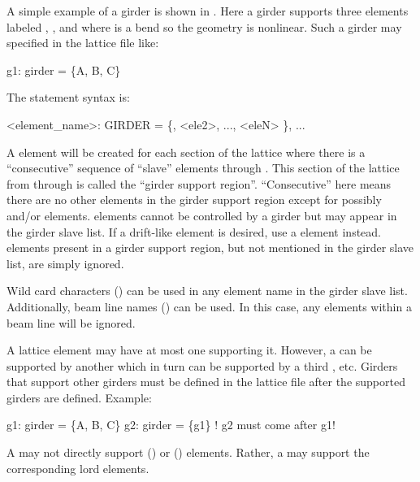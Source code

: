 A simple example of a girder is shown in . Here a girder
supports three elements labeled , , and  where
 is a bend so the geometry is nonlinear. Such a girder may
specified in the lattice file like:
\begin{example}
  g1: girder = \{A, B, C\}
\end{example}
The  statement syntax is:
\begin{example}
  <element_name>: GIRDER = \{<ele1>, <ele2>, ..., <eleN> \}, ...
\end{example}
A  element will be created for each section of the lattice
where there is a ``consecutive'' sequence of ``slave'' elements
 through .  This section of the lattice from
 through  is called the ``girder support
region''.  ``Consecutive'' here means there are no other elements in the
girder support region except for possibly  and/or 
elements.   elements cannot be controlled by a girder but may
appear in the girder slave list. If a drift-like element is
desired, use a  element instead.  elements present
in a girder support region, but not mentioned in the girder slave
list, are simply ignored.

Wild card characters () can be used in any element
name in the girder slave list. Additionally, beam line names
() can be used. In this case, any  elements
within a beam line will be ignored.

A lattice element may have at most one  supporting
it. However, a  can be supported by another 
which in turn can be supported by a third , etc. Girders
that support other girders must be defined in the lattice file after
the supported girders are defined. Example:
\begin{example}
  g1: girder = \{A, B, C\}
  g2: girder = \{g1\}      ! g2 must come after g1!
\end{example}

A  may not directly support 
() or  ()
elements. Rather, a  may support the corresponding lord
elements.

